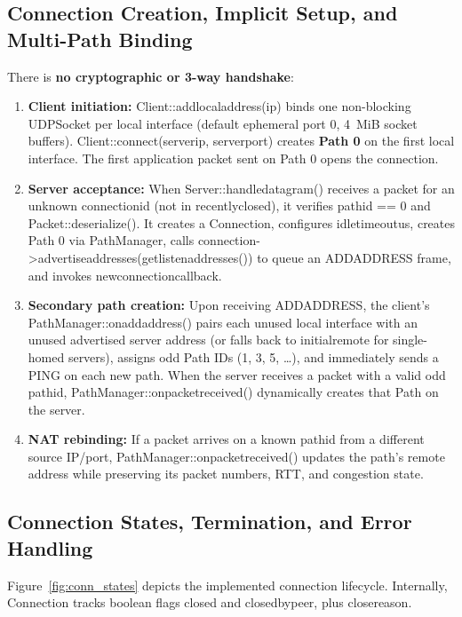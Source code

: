 \documentclass[10pt,a4paper]{article}
\newcommand{\codeul}{\textunderscore\hspace{0pt}}
\DeclareRobustCommand{\code}[1]{{\ttfamily\let\_\codeul #1}}
\begin{document}
\subsection{Connection Creation, Implicit Setup, and Multi-Path Binding}
There is \textbf{no cryptographic or 3-way handshake}:
\begin{enumerate}
    \item \textbf{Client initiation:} \code{Client::add\_local\_address(ip)} binds one non-blocking \code{UDPSocket} per local interface (default ephemeral port 0, 4~MiB socket buffers). \code{Client::connect(server\_ip, server\_port)} creates \textbf{Path 0} on the first local interface. The first application packet sent on Path 0 opens the connection.
    \item \textbf{Server acceptance:} When \code{Server::handle\_datagram()} receives a packet for an unknown \code{connection\_id} (not in \code{recently\_closed}), it verifies \code{path\_id == 0} and \code{Packet::deserialize()}. It creates a \code{Connection}, configures \code{idle\_timeout\_us}, creates Path 0 via \code{PathManager}, calls \code{connection->advertise\_addresses(get\_listen\_addresses())} to queue an \code{ADD\_ADDRESS} frame, and invokes \code{new\_connection\_callback}.
    \item \textbf{Secondary path creation:} Upon receiving \code{ADD\_ADDRESS}, the client's \code{PathManager::on\_add\_address()} pairs each unused local interface with an unused advertised server address (or falls back to \code{initial\_remote} for single-homed servers), assigns odd Path IDs (\code{1, 3, 5, \dots}), and immediately sends a \code{PING} on each new path. When the server receives a packet with a valid odd \code{path\_id}, \code{PathManager::on\_packet\_received()} dynamically creates that \code{Path} on the server.
    \item \textbf{NAT rebinding:} If a packet arrives on a known \code{path\_id} from a different source IP/port, \code{PathManager::on\_packet\_received()} updates the path's remote address while preserving its packet numbers, RTT, and congestion state.
\end{enumerate}

\subsection{Connection States, Termination, and Error Handling}
Figure~\ref{fig:conn_states} depicts the implemented connection lifecycle. Internally, \code{Connection} tracks boolean flags \code{closed} and \code{closed\_by\_peer}, plus \code{close\_reason}.
\end{document}
